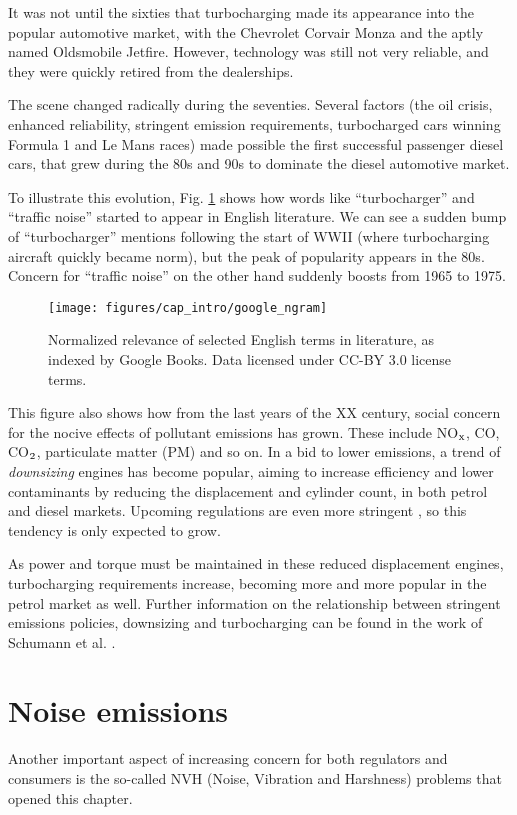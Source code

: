 It was not until the sixties that turbocharging made its appearance into the popular automotive market, with the Chevrolet Corvair Monza and the aptly named Oldsmobile Jetfire. However, technology was still not very reliable, and they were quickly retired from the dealerships.

The scene changed radically during the seventies. Several factors (the oil crisis, enhanced reliability, stringent emission requirements, turbocharged cars winning Formula 1 and Le Mans races) made possible the first successful passenger diesel cars, that grew during the 80s and 90s to dominate the diesel automotive market.

To illustrate this evolution, Fig. \ref{fig:google_ngram} shows how words like ``turbocharger'' and ``traffic noise'' started to appear in English literature. We can see a sudden bump of ``turbocharger'' mentions following the start of WWII (where turbocharging aircraft quickly became norm), but the peak of popularity appears in the 80s. Concern for ``traffic noise'' on the other hand suddenly boosts from 1965 to 1975.

\begin{figure}[b!]
	\centering
	\texttt{[image: figures/cap\_intro/google\_ngram]}
	\caption{Normalized relevance of selected English terms in literature, as indexed by Google Books. Data licensed under CC-BY 3.0 license terms.}
	\label{fig:google_ngram}
\end{figure}

This figure also shows how from the last years of the XX century, social concern for the nocive effects of pollutant emissions has grown. These include NO${}_\text x$, CO, CO${}_\text 2$, particulate matter (PM) and so on. In a bid to lower emissions, a trend of \emph{downsizing} engines has become popular, aiming to increase efficiency and lower contaminants by reducing the displacement and cylinder count, in both petrol and diesel markets. Upcoming regulations are even more stringent \cite{deBeeck2013upcoming}, so this tendency is only expected to grow.

As power and torque must be maintained in these reduced displacement engines, turbocharging requirements increase, becoming more and more popular in the petrol market as well. Further information on the relationship between stringent emissions policies, downsizing and turbocharging can be found in the work of Schumann et al. \cite{schumann2012potential}.

\section{Noise emissions}
Another important aspect of increasing concern for both regulators and consumers is the so-called NVH (Noise, Vibration and Harshness) problems that opened this chapter.


